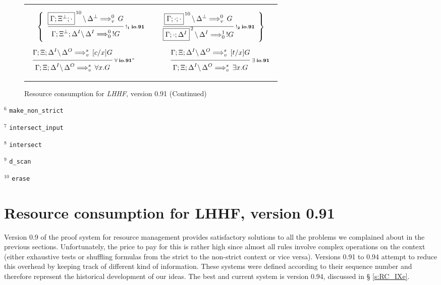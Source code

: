 \begin{figure}[t]
\begin{center}
\begin{tabular}{|c|}
      \\ \\ \\
      $\left\{
        \begin{array}{ccc}
          \ruleI
            {\ioIXb{\fb{\G;\X^\Bot;\cdot}{10}}{\D^\Bot}{G}{v}{0}}
            {\ioIXb{\G;\X^\Bot;\D^I}{\D^I}{!G}{0}{0}}
            {!_1 \: io.91}
        &
          \hspace{0.5em}
        &
          \ruleI
            {\ioIXb{\fb{\G;\cdot;\cdot}{10}}{\D^\Bot}{G}{v}{0}}
            {\ioIXb{\fb{\G;\cdot;\D^I}{2}}{\D^I}{!G}{0}{1}}
            {!_2 \: io.91}
        \end{array}
      \right\}$

      \\ \\
      $\begin{array}{ccc}
        \ruleI
          {\ioIXb{\G;\X;\D^I}{\D^O}{[c/x]G}{v}{s}}
          {\ioIXb{\G;\X;\D^I}{\D^O}{\A x. G}{v}{s}}
          {\A \: io.91^*}
       &
         \hspace{3em}
       &
         \ruleI
           {\ioIXb{\G;\X;\D^I}{\D^O}{[t/x]G}{v}{s}}
           {\ioIXb{\G;\X;\D^I}{\D^O}{\E x. G}{v}{s}}
           {\E \: io.91}
       \end{array}$
       \\ \\
       \hline
     \end{tabular}

    \caption{Resource consumption for {\em LHHF}, version 0.91 (Continued)}
    \label{fig:RC_IXb2}
  \end{center}
\end{figure}

\bigskip

$^6$ {\tt make\_non\_strict}

$^7$ {\tt intersect\_input}

$^8$ {\tt intersect}

$^9$ {\tt d\_scan}

$^{10}$ {\tt erase}




\newpage
\section{Resource consumption for LHHF, version 0.91}
\label{s:RC_IXb}

Version 0.9 of the proof system for resource management provides satisfactory
solutions to all the problems we complained about in the previous
sections. Unfortunately, the price to pay for this is rather high since
almost all rules involve complex operations on the context (either exhaustive
tests or shuffling formulas from the strict to the non-strict context or vice
versa). Versions 0.91 to 0.94 attempt to reduce this overhead by keeping
track of different kind of information. These systems were defined according
to their sequence number and therefore represent the historical development
of our ideas. The best and current system is version 0.94, discussed in \S
\ref{s:RC_IXe}.

